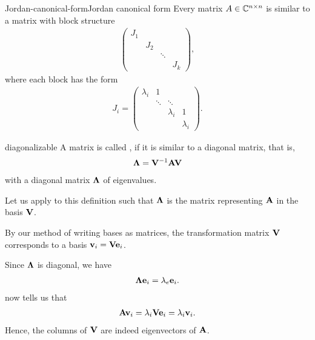 \begin{Theorem*}{Jordan-canonical-form}{Jordan canonical form}
  Every matrix $A\in\mathbb C^{n\times n}$ is similar to a matrix with block structure
  \begin{gather}
    \begin{pmatrix}
      J_1\\&J_2\\&&\ddots\\&&&J_k
    \end{pmatrix},
  \end{gather}
  where each block has the form
  \begin{gather}
    J_i = \begin{pmatrix}
      \lambda_i&1\\&\ddots&\ddots\\
      &&\lambda_i&1\\
      &&&\lambda_i
    \end{pmatrix}.
  \end{gather}
\end{Theorem*}


\begin{Definition}{diagonalizable}
  A matrix is called , if it is similar to a diagonal matrix, that is,
  \begin{gather}
    \boldsymbol\Lambda = \mathbf V^{-1} \mathbf A \mathbf V
  \end{gather}
  with a diagonal matrix $\boldsymbol\Lambda$ of eigenvalues.
\end{Definition}

\begin{remark}
  Let us apply  to this
  definition such that $\boldsymbol\Lambda$ is the matrix representing $\mathbf A$
  in the basis $\mathbf V$.

  By our method of writing bases as matrices, the transformation
  matrix $\mathbf V$ corresponds to a basis $\mathbf v_i = \mathbf V\mathbf e_i$.

  Since $\boldsymbol\Lambda$ is diagonal, we have
  \begin{gather}
    \boldsymbol\Lambda\mathbf e_i = \lambda_e\mathbf e_i.
  \end{gather}
   now tells us that
  \begin{gather}
    \mathbf A\mathbf v_i = \lambda_i\mathbf V\mathbf e_i=\lambda_i\mathbf v_i.    
  \end{gather}
  Hence, the columns of $\mathbf V$ are indeed eigenvectors of $\mathbf A$.
\end{remark}

